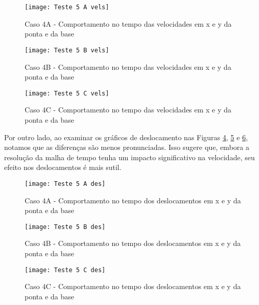 \begin{figure}[H]
    \begin{center}
    \caption{Caso 4A - Comportamento no tempo das velocidades em x e y da ponta e da base}
    \texttt{[image: Teste 5 A vels]}
    \label{fig:t_5a_vels}
    \end{center}
\end{figure}

\begin{figure}[H]
    \begin{center}
    \caption{Caso 4B - Comportamento no tempo das velocidades em x e y da ponta e da base}
    \texttt{[image: Teste 5 B vels]}
    \label{fig:t_5b_vels}
    \end{center}
\end{figure}

\begin{figure}[H]
    \begin{center}
    \caption{Caso 4C - Comportamento no tempo das velocidades em x e y da ponta e da base}
    \texttt{[image: Teste 5 C vels]}
    \label{fig:t_5c_vels}
    \end{center}
\end{figure}

Por outro lado, ao examinar os gráficos de deslocamento nas Figuras \ref{fig:t_5a_des}, \ref{fig:t_5b_des} e \ref{fig:t_5c_des}, notamos que as diferenças são menos pronunciadas. Isso sugere que, embora a resolução da malha de tempo tenha um impacto significativo na velocidade, seu efeito nos deslocamentos é mais sutil.

\begin{figure}[H]
    \begin{center}
    \caption{Caso 4A - Comportamento no tempo dos deslocamentos em x e y da ponta e da base}
    \texttt{[image: Teste 5 A des]}
    \label{fig:t_5a_des}
    \end{center}
\end{figure}

\begin{figure}[H]
    \begin{center}
    \caption{Caso 4B - Comportamento no tempo dos deslocamentos em x e y da ponta e da base}
    \texttt{[image: Teste 5 B des]}
    \label{fig:t_5b_des}
    \end{center}
\end{figure}

\begin{figure}[H]
    \begin{center}
    \caption{Caso 4C - Comportamento no tempo dos deslocamentos em x e y da ponta e da base}
    \texttt{[image: Teste 5 C des]}
    \label{fig:t_5c_des}
    \end{center}
\end{figure}

